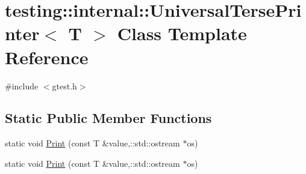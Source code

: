 \hypertarget{classtesting_1_1internal_1_1_universal_terse_printer}{\section{testing\-:\-:internal\-:\-:Universal\-Terse\-Printer$<$ T $>$ Class Template Reference}
\label{classtesting_1_1internal_1_1_universal_terse_printer}
}


{\ttfamily \#include $<$gtest.\-h$>$}

\subsection*{Static Public Member Functions}
\begin{DoxyCompactItemize}
\item 
static void \hyperlink{classtesting_1_1internal_1_1_universal_terse_printer_a2e16ee42c9b18fca397cd95f32e8e879}{Print} (const T \&value,\-::std\-::ostream $\ast$os)
\item 
static void \hyperlink{classtesting_1_1internal_1_1_universal_terse_printer_a2e16ee42c9b18fca397cd95f32e8e879}{Print} (const T \&value,\-::std\-::ostream $\ast$os)
\end{DoxyCompactItemize}


